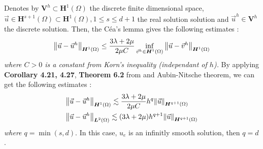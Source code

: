\documentclass[a4paper,12pt,twoside]{report}
\begin{document}
Denotes by $\boldsymbol V^h \subset \boldsymbol H^1(\Omega)$ the discrete finite dimensional space, $\vec u \in \boldsymbol H^{s+1}(\Omega) \subset \boldsymbol H^1(\Omega), 1 \leq s \leq d+1$ the real solution solution and $\vec u^h \in \boldsymbol V^h$ the discrete solution.
Then, the Céa's lemma gives the following estimates : 
$$\norm{\vec u - \vec u^h}_{\boldsymbol H^1(\Omega)} \leq \frac{3\lambda + 2\mu}{2\mu C} \inf_{\vec v^h \in \boldsymbol H^1(\Omega)} \norm{\vec u - \vec v^h}_{\boldsymbol H^1(\Omega)}$$
\textit{where $C > 0$ is a constant from Korn's inequality (independant of $h$).}
By applying \textbf{Corollary 4.21, 4.27}, \textbf{Theorem 6.2} from \cite{da_veiga_mathematical_2014} and Aubin-Nitsche theorem, we can get the following estimates : 
\begin{equation}
\begin{aligned}
& \norm{\vec u - \vec u^h}_{\boldsymbol H^1(\Omega)} \lesssim \frac{3\lambda + 2\mu}{2\mu C} h^q \norm{\vec u}_{\boldsymbol H^{q+1}(\Omega)} \\
& \norm{\vec u - \vec u^h}_{\boldsymbol L^2(\Omega)} \lesssim (3\lambda + 2\mu) h^{q+1}\norm{\vec u}_{\boldsymbol H^{q+1}(\Omega)}
\end{aligned}
\label{eq:convergence_estimates}
\end{equation}
\textit{where $q = \min{(s,d)}$}. In this case, $u_e$ is an infinitly smooth solution, then $q = d$. 
\end{document}
